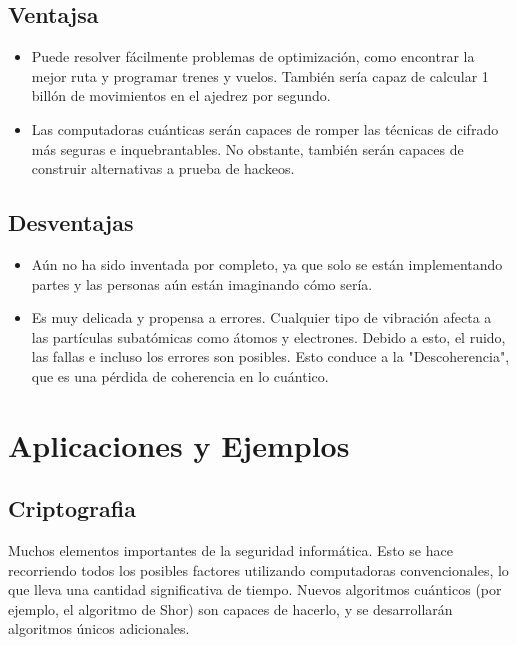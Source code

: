 \documentclass[11pt]{article}
\begin{document}
\subsection{Ventajsa}
\label{sec:orgf8c4941}
\begin{itemize}
\item \autocite{Marella_Parisa_2020} Puede resolver fácilmente problemas de optimización, como encontrar la mejor ruta y programar trenes y vuelos. También sería capaz de calcular 1 billón de movimientos en el ajedrez por segundo.

\item \autocite{Marella_Parisa_2020} Las computadoras cuánticas serán capaces de romper las técnicas de cifrado más seguras e inquebrantables. No obstante, también serán capaces de construir alternativas a prueba de hackeos.
\end{itemize}

\subsection{Desventajas}
\label{sec:org44afa83}
\begin{itemize}
\item \autocite{Marella_Parisa_2020} Aún no ha sido inventada por completo, ya que solo se están implementando partes y las personas aún están imaginando cómo sería.

\item \autocite{Marella_Parisa_2020} Es muy delicada y propensa a errores. Cualquier tipo de vibración afecta a las partículas subatómicas como átomos y electrones. Debido a esto, el ruido, las fallas e incluso los errores son posibles. Esto conduce a la "Descoherencia", que es una pérdida de coherencia en lo cuántico.
\end{itemize}

\section{Aplicaciones y Ejemplos}
\label{sec:orgdfd5559}
\subsection{Criptografia}
\label{sec:org8d91c57}
\autocite{Marella_Parisa_2020} Muchos elementos importantes de la seguridad informática. Esto se hace recorriendo todos los posibles factores utilizando computadoras convencionales, lo que lleva una cantidad significativa de tiempo. Nuevos algoritmos cuánticos (por ejemplo, el algoritmo de Shor) son capaces de hacerlo, y se desarrollarán algoritmos únicos adicionales. 
\end{document}

